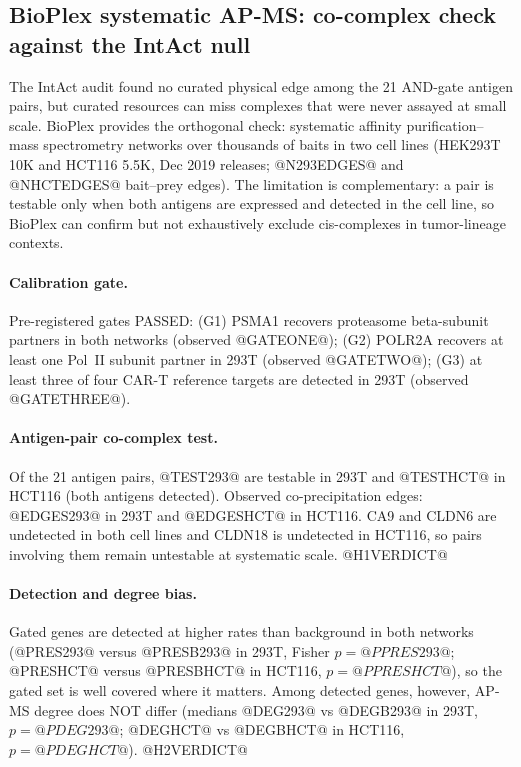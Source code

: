 \subsection{BioPlex systematic AP-MS: co-complex check against the IntAct null}
\label{sec:bioplex}
The IntAct audit found no curated physical edge among the 21 AND-gate antigen
pairs, but curated resources can miss complexes that were never assayed at
small scale. BioPlex provides the orthogonal check: systematic affinity
purification--mass spectrometry networks over thousands of baits in two cell
lines (HEK293T 10K and HCT116 5.5K, Dec 2019 releases; @N293EDGES@ and
@NHCTEDGES@ bait--prey edges). The limitation is complementary: a pair is
testable only when both antigens are expressed and detected in the cell line,
so BioPlex can confirm but not exhaustively exclude cis-complexes in
tumor-lineage contexts.

\paragraph{Calibration gate.} Pre-registered gates PASSED: (G1) PSMA1
recovers proteasome beta-subunit partners in both networks (observed
@GATEONE@); (G2) POLR2A recovers at least one Pol~II subunit partner in
293T (observed @GATETWO@); (G3) at least three of four CAR-T reference
targets are detected in 293T (observed @GATETHREE@).

\paragraph{Antigen-pair co-complex test.} Of the 21 antigen pairs,
@TEST293@ are testable in 293T and @TESTHCT@ in HCT116 (both antigens
detected). Observed co-precipitation edges: @EDGES293@ in 293T and
@EDGESHCT@ in HCT116. CA9 and CLDN6 are undetected in both cell lines and
CLDN18 is undetected in HCT116, so pairs involving them remain untestable at
systematic scale. @H1VERDICT@

\paragraph{Detection and degree bias.} Gated genes are detected at higher
rates than background in both networks (@PRES293@ versus @PRESB293@ in 293T,
Fisher $p=@PPRES293@$; @PRESHCT@ versus @PRESBHCT@ in HCT116, $p=@PPRESHCT@$),
so the gated set is well covered where it matters. Among detected genes,
however, AP-MS degree does NOT differ (medians @DEG293@ vs @DEGB293@ in 293T,
$p=@PDEG293@$; @DEGHCT@ vs @DEGBHCT@ in HCT116, $p=@PDEGHCT@$). @H2VERDICT@


